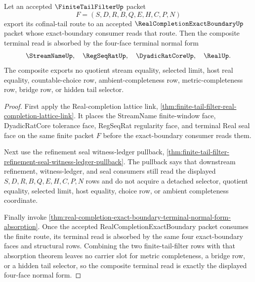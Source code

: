 \begin{theorem}
\label{thm:finite-tail-filter-exact-boundary-terminal-normal-form}
Let an accepted $\FiniteTailFilterUp$ packet
$$
F=(S,D,R,B,Q,E,H,C,P,N)
$$
export its cofinal-tail route to an accepted $\RealCompletionExactBoundaryUp$ packet whose exact-boundary consumer reads that route. Then the composite terminal read is absorbed by the four-face terminal normal form
$$
\StreamNameUp,\quad \RegSeqRatUp,\quad \DyadicRatCoreUp,\quad \RealUp.
$$
The composite exports no quotient stream equality, selected limit, host real equality, countable-choice row, ambient-completeness row, metric-completeness row, bridge row, or hidden tail selector.
\end{theorem}
\begin{proof}
First apply the Real-completion lattice link, \autoref{thm:finite-tail-filter-real-completion-lattice-link}. It places the StreamName finite-window face, DyadicRatCore tolerance face, RegSeqRat regularity face, and terminal Real seal face on the same finite packet $F$ before the exact-boundary consumer reads them.

Next use the refinement seal witness-ledger pullback, \autoref{thm:finite-tail-filter-refinement-seal-witness-ledger-pullback}. The pullback says that downstream refinement, witness-ledger, and seal consumers still read the displayed $S,D,R,B,Q,E,H,C,P,N$ rows and do not acquire a detached selector, quotient equality, selected limit, host equality, choice row, or ambient completeness coordinate.

Finally invoke \autoref{thm:real-completion-exact-boundary-terminal-normal-form-absorption}. Once the accepted RealCompletionExactBoundary packet consumes the finite route, its terminal read is absorbed by the same four exact-boundary faces and structural rows. Combining the two finite-tail-filter rows with that absorption theorem leaves no carrier slot for metric completeness, a bridge row, or a hidden tail selector, so the composite terminal read is exactly the displayed four-face normal form.
\end{proof}


